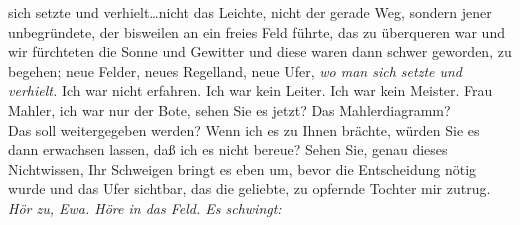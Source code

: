 \documentclass[
]{article}
\begin{document}
sich setzte und verhielt\ldots* nicht das Leichte, nicht der gerade Weg,
sondern jener unbegründete, der bisweilen an ein freies Feld führte, das
zu überqueren war und wir fürchteten die Sonne und Gewitter und diese
waren dann schwer geworden, zu begehen; neue Felder, neues Regelland,
neue Ufer, \emph{wo man sich setzte und verhielt.} Ich war nicht
erfahren. Ich war kein Leiter. Ich war kein Meister. Frau Mahler, ich
war nur der Bote, sehen Sie es jetzt? Das Mahlerdiagramm?\\
Das soll weitergegeben werden? Wenn ich es zu Ihnen brächte, würden Sie
es dann erwachsen lassen, daß ich es nicht bereue? Sehen Sie, genau
dieses Nichtwissen, Ihr Schweigen bringt es eben um, bevor die
Entscheidung nötig wurde und das Ufer sichtbar, das die geliebte, zu
opfernde Tochter mir zutrug. \emph{Hör zu, Ewa. Höre in das Feld. Es
schwingt:}
\end{document}
